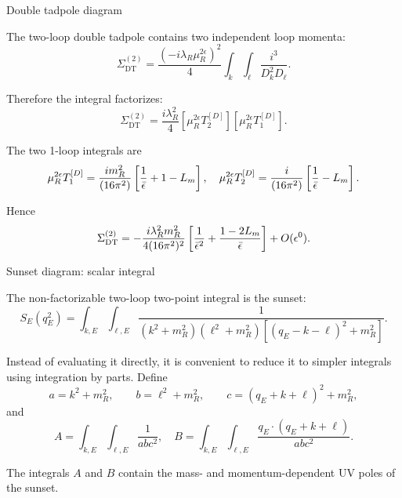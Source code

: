 \documentclass[aspectratio=169,10pt]{beamer}
\begin{document}
\begin{frame}{Double tadpole diagram}

The two-loop double tadpole contains two independent loop momenta:
\begin{equation}
\Sigma_{\mathrm{DT}}^{(2)}
=
\frac{(-i\lambda_R\mu_R^{2\epsilon})^2}{4}
\int_k\int_\ell
\frac{i^3}{D_k^2D_\ell}.
\end{equation}

Therefore the integral factorizes:
\begin{equation}
\Sigma_{\mathrm{DT}}^{(2)}
=
\frac{i\lambda_R^2}{4}
\left[
\mu_R^{2\epsilon}T_2^{[D]}
\right]
\left[
\mu_R^{2\epsilon}T_1^{[D]}
\right].
\end{equation}

The two 1-loop integrals are
\begin{equation}
\mu_R^{2\epsilon}T_1^{[D]}
=
\frac{im_R^2}{(16\pi^2)}
\left[
\frac1{\bar\epsilon}
+
1-L_m
\right], \quad
\mu_R^{2\epsilon}T_2^{[D]}
=
\frac{i}{(16\pi^2)}
\left[
\frac1{\bar\epsilon}
-L_m
\right].
\end{equation}

Hence
\begin{equation}
\Sigma_{\mathrm{DT}}^{(2)}
=
-\frac{i\lambda_R^2m_R^2}{4(16\pi^2)^2}
\left[
\frac1{\bar\epsilon^2}
+
\frac{1-2L_m}{\bar\epsilon}
\right]
+
O(\epsilon^0).
\end{equation}


\end{frame}


\begin{frame}{Sunset diagram: scalar integral}

The non-factorizable two-loop two-point integral is the sunset:
\begin{equation}
S_E(q_E^2)
=
\int_{k,E}
\int_{\ell,E}
\frac1{
(k^2+m_R^2)
(\ell^2+m_R^2)
[(q_E-k-\ell)^2+m_R^2]
}.
\end{equation}

Instead of evaluating it directly, it is convenient to reduce it
to simpler integrals using integration by parts. Define
\begin{equation}
a=k^2+m_R^2,
\qquad
b=\ell^2+m_R^2,
\qquad
c=(q_E+k+\ell)^2+m_R^2,
\end{equation}
and
\begin{equation}
A
=
\int_{k,E}\int_{\ell,E}
\frac1{abc^2},\quad 
B
=
\int_{k,E}\int_{\ell,E}
\frac{q_E\cdot(q_E+k+\ell)}{abc^2}.
\end{equation}

The integrals $A$ and $B$ contain the mass- and
momentum-dependent UV poles of the sunset.

\end{frame}
\end{document}
